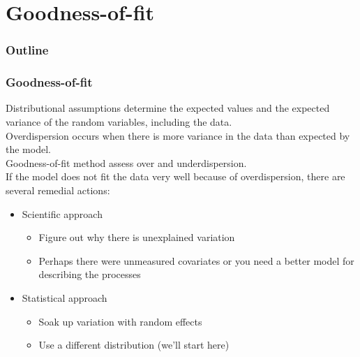 \documentclass[color=usenames,dvipsnames]{beamer}\usepackage[]{graphicx}\usepackage[]{color}
\begin{document}





\section{Goodness-of-fit}



\begin{frame}[plain]
  \frametitle{Outline}
  \Large
\end{frame}



\begin{frame}
  \frametitle{Goodness-of-fit}
  \small
  Distributional assumptions determine the expected values
  \alert{and the expected variance} of the random variables, including
  the data. \\  
  \pause
  \vfill
  Overdispersion occurs when there is more variance in the data than
  expected by the model. \\
  \pause
  \vfill
  Goodness-of-fit method assess over and underdispersion. \\
  \pause
  \vfill
  If the model does not fit the data very well because of
  overdispersion, there are several remedial actions:
  \begin{itemize}
  \item<5-> Scientific approach
    \begin{itemize}
       \item Figure out why there is unexplained variation
       \item Perhaps there were unmeasured covariates or you need a
         better model for describing the processes
    \end{itemize}
  \item<6-> Statistical approach
    \begin{itemize}
      \item Soak up variation with random effects
      \item Use a different distribution (we'll start here)
    \end{itemize}
  \end{itemize}
\end{frame}
\end{document}
